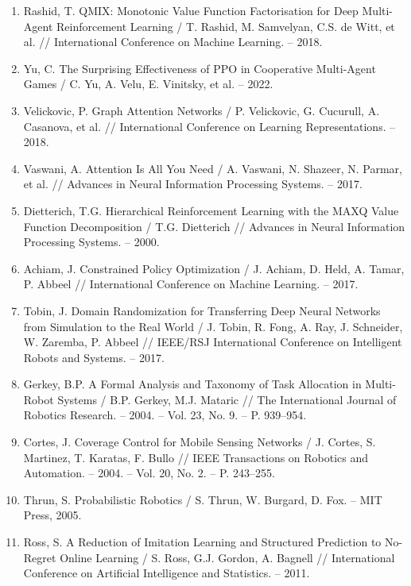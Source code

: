 \documentclass[14pt,a4paper]{extarticle}
\begin{document}
\begin{enumerate}[label=\arabic*., leftmargin=1.25cm]
  \item Rashid, T. QMIX: Monotonic Value Function Factorisation for Deep Multi-Agent Reinforcement Learning / T. Rashid, M. Samvelyan, C.S. de Witt, et al. // International Conference on Machine Learning. -- 2018.

  \item Yu, C. The Surprising Effectiveness of PPO in Cooperative Multi-Agent Games / C. Yu, A. Velu, E. Vinitsky, et al. -- 2022.

  \item Velickovic, P. Graph Attention Networks / P. Velickovic, G. Cucurull, A. Casanova, et al. // International Conference on Learning Representations. -- 2018.

  \item Vaswani, A. Attention Is All You Need / A. Vaswani, N. Shazeer, N. Parmar, et al. // Advances in Neural Information Processing Systems. -- 2017.

  \item Dietterich, T.G. Hierarchical Reinforcement Learning with the MAXQ Value Function Decomposition / T.G. Dietterich // Advances in Neural Information Processing Systems. -- 2000.

  \item Achiam, J. Constrained Policy Optimization / J. Achiam, D. Held, A. Tamar, P. Abbeel // International Conference on Machine Learning. -- 2017.

  \item Tobin, J. Domain Randomization for Transferring Deep Neural Networks from Simulation to the Real World / J. Tobin, R. Fong, A. Ray, J. Schneider, W. Zaremba, P. Abbeel // IEEE/RSJ International Conference on Intelligent Robots and Systems. -- 2017.

  \item Gerkey, B.P. A Formal Analysis and Taxonomy of Task Allocation in Multi-Robot Systems / B.P. Gerkey, M.J. Mataric // The International Journal of Robotics Research. -- 2004. -- Vol. 23, No. 9. -- P. 939--954.

  \item Cortes, J. Coverage Control for Mobile Sensing Networks / J. Cortes, S. Martinez, T. Karatas, F. Bullo // IEEE Transactions on Robotics and Automation. -- 2004. -- Vol. 20, No. 2. -- P. 243--255.

  \item Thrun, S. Probabilistic Robotics / S. Thrun, W. Burgard, D. Fox. -- MIT Press, 2005.

  \item Ross, S. A Reduction of Imitation Learning and Structured Prediction to No-Regret Online Learning / S. Ross, G.J. Gordon, A. Bagnell // International Conference on Artificial Intelligence and Statistics. -- 2011.


\end{enumerate}
\end{document}
